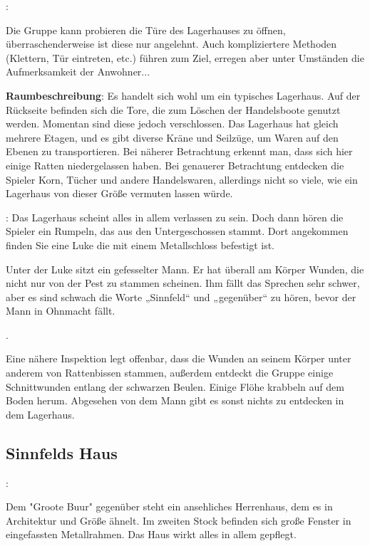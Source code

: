 :

Die Gruppe kann probieren die Türe des Lagerhauses zu öffnen, überraschenderweise ist diese nur angelehnt. Auch kompliziertere Methoden (Klettern, Tür eintreten, etc.) führen zum Ziel, erregen aber unter Umständen die Aufmerksamkeit der Anwohner...

\textbf{Raumbeschreibung}: Es handelt sich wohl um ein typisches Lagerhaus. Auf der Rückseite befinden sich die Tore, die zum Löschen der Handelsboote genutzt werden. Momentan sind diese jedoch verschlossen. Das Lagerhaus hat gleich mehrere Etagen, und es gibt diverse Kräne und Seilzüge, um Waren auf den Ebenen zu transportieren. Bei näherer Betrachtung erkennt man, dass sich hier einige Ratten niedergelassen haben. Bei genauerer Betrachtung entdecken die Spieler Korn, Tücher und andere Handelswaren, allerdings nicht so viele, wie ein Lagerhaus von dieser Größe vermuten lassen würde.

: Das Lagerhaus scheint alles in allem verlassen zu sein. Doch dann hören die Spieler ein Rumpeln, das aus den Untergeschossen stammt. Dort angekommen finden Sie eine Luke die mit einem Metallschloss befestigt ist.


Unter der Luke sitzt ein gefesselter Mann. Er hat überall am Körper Wunden, die nicht nur von der Pest zu stammen scheinen. Ihm fällt das Sprechen sehr schwer, aber es sind schwach die Worte „Sinnfeld“ und „gegenüber“ zu hören, bevor der Mann in Ohnmacht fällt.

.

Eine nähere Inspektion legt offenbar, dass die Wunden an seinem Körper unter anderem von Rattenbissen stammen, außerdem entdeckt die Gruppe einige Schnittwunden entlang der schwarzen Beulen. Einige Flöhe krabbeln auf dem Boden herum. Abgesehen von dem Mann gibt es sonst nichts zu entdecken in dem Lagerhaus.

\subsection*{Sinnfelds Haus}
\label{sinnfelds haus}
:

Dem "Groote Buur" gegenüber steht ein ansehliches Herrenhaus, dem es in Architektur und Größe ähnelt. Im zweiten Stock befinden sich große Fenster in eingefassten Metallrahmen. Das Haus wirkt alles in allem gepflegt.

